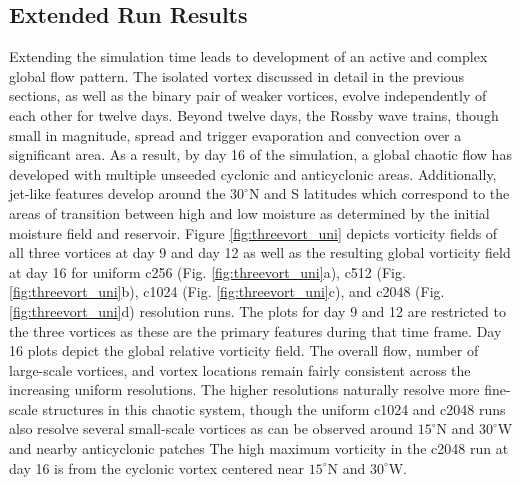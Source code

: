      \subsection{Extended Run Results} \label{sec:extended}
Extending the simulation time leads to development of an active and complex global flow pattern.
The isolated vortex discussed in detail in the previous sections, as well as the binary
pair of weaker vortices, evolve independently of each other for twelve days. 
Beyond twelve days, the Rossby wave trains, though small in magnitude,
spread and trigger evaporation and convection over a significant area.
As a result, by day 16 of the simulation, a global chaotic flow has developed with multiple unseeded
cyclonic and anticyclonic areas.  Additionally, jet-like features
develop around the $30^\circ$N and S latitudes which correspond to the areas of transition between high and low moisture 
as determined by the initial moisture field and reservoir.
Figure \ref{fig:threevort_uni} depicts vorticity fields of all three vortices 
at day 9 and day 12 as well as the resulting global vorticity field at day 16
for uniform c256 (Fig. \ref{fig:threevort_uni}a), c512 (Fig. \ref{fig:threevort_uni}b),
c1024 (Fig. \ref{fig:threevort_uni}c), and c2048 (Fig. \ref{fig:threevort_uni}d) resolution
runs. The plots for day 9 and 12 are restricted to the three vortices as
these are the primary features during that time frame. Day 16 plots depict the 
global relative vorticity field. The overall flow, number of large-scale vortices,
and vortex locations remain fairly consistent across the increasing uniform resolutions.
The higher resolutions naturally resolve more fine-scale structures in this chaotic system, though
the uniform c1024 and c2048 runs also resolve several small-scale vortices as can be observed around $15^\circ$N and $30^\circ$W and nearby anticyclonic patches The high maximum vorticity in the c2048 run at day 16 is from the cyclonic vortex centered near $15^\circ$N and $30^\circ$W.

